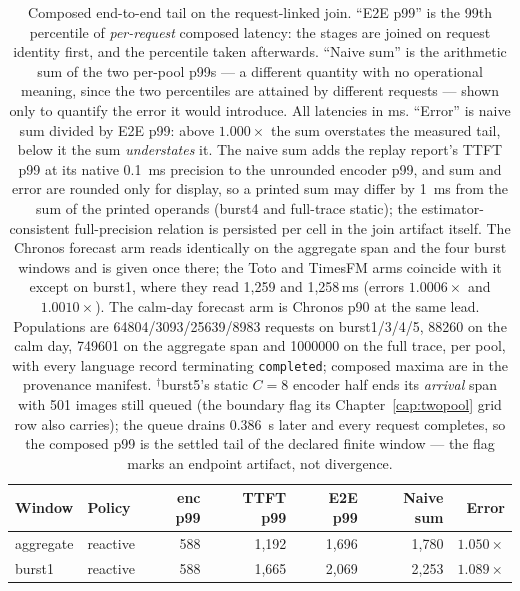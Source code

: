 \begin{table}[htbp]
\centering
\caption[Composed end-to-end tail on the request-linked join]{Composed
end-to-end tail on the request-linked join. ``E2E p99'' is the 99th percentile
of \emph{per-request} composed latency: the stages are joined on request
identity first, and the percentile taken afterwards. ``Naive sum'' is the
arithmetic sum of the two per-pool p99s --- a different quantity with no
operational meaning, since the two percentiles are attained by different
requests --- shown only to quantify the error it would introduce. All latencies
in \si{\milli\second}. ``Error'' is naive sum divided by E2E p99: above
$1.000\times$ the sum overstates the measured tail, below it the sum
\emph{understates} it. The naive sum adds the replay report's TTFT p99 at its
native \SI{0.1}{\milli\second} precision to the unrounded encoder p99, and
sum and error are rounded only for display, so a printed sum may differ by
\SI{1}{\milli\second} from the sum of the printed operands (burst4 and
full-trace static); the estimator-consistent full-precision relation is
persisted per cell in the join artifact itself. The Chronos forecast arm reads identically on the
aggregate span and the four burst windows and is given once there; the Toto and
TimesFM arms coincide with it except on burst1, where they read 1{,}259 and
1{,}258\,\si{\milli\second} (errors $1.0006\times$ and $1.0010\times$). The
calm-day forecast arm is Chronos p90 at the same lead. Populations are
\num{64804}/\num{3093}/\num{25639}/\num{8983} requests on burst1/3/4/5,
\num{88260} on the calm day, \num{749601} on the aggregate span and
\num{1000000} on the full trace, per pool, with every language record
terminating \texttt{completed}; composed maxima are in the provenance manifest.
$^{\dagger}$burst5's static $C{=}8$ encoder half ends its \emph{arrival}
span with \num{501} images still queued (the boundary flag its
Chapter~\ref{cap:twopool} grid row also carries); the queue drains
\SI{0.386}{\second} later and every request completes, so the composed p99
is the settled tail of the declared finite window --- the flag marks an
endpoint artifact, not divergence.}
\label{tab:cl-ledger-joint}
\footnotesize
\setlength{\tabcolsep}{3pt}
\begin{tabular}{@{}llrrrrr@{}}
\toprule
Window & Policy & enc p99 & TTFT p99 & E2E p99 & Naive sum & Error \\
\midrule
aggregate & reactive & 588 & 1{,}192 & 1{,}696 & 1{,}780 & $1.050\times$ \\
burst1 & reactive & 588 & 1{,}665 & 2{,}069 & 2{,}253 & $1.089\times$ \\

\end{tabular}
\end{table}
